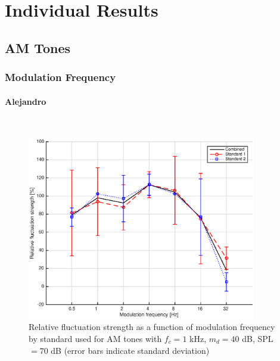 \documentclass[a4paper]{article}
\begin{document}
\custombibliography

\clearpage

\appendix

\section{Individual Results}

\subsection{AM Tones}

\subsubsection{Modulation Frequency}

\paragraph{Alejandro} ~\\

\begin{figure}[H]
    \centering
    \includegraphics[height=8cm]{img/AM_tones-fm-results-AO-standards}
    \caption{Relative fluctuation strength as a function of modulation
        frequency by standard used for AM tones with $f_c = 1$ kHz, $m_d = 40$
        dB, SPL $= 70$ dB (error bars indicate standard deviation)}
\end{figure}
\end{document}
